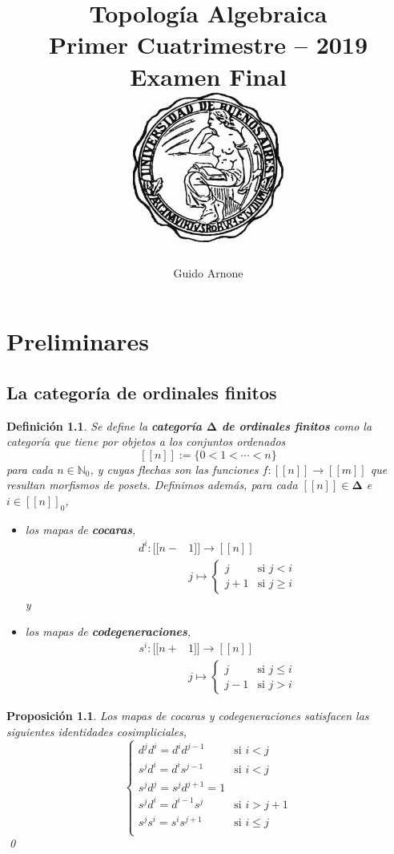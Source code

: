 \documentclass[11pt]{report}
\title{
\LARGE{Topología Algebraica}
\\
\vspace{3pt}
\small{Primer Cuatrimestre -- 2019}
\\
\vspace{0.5pt}
\large{Examen Final}
\\
\vspace{80pt}
{\includegraphics[height=5cm]{uba2.jpg}}
\vspace{80pt}
}
\author{Guido Arnone}
\date{}
\theoremstyle{colored}
\newtheorem{definition}{Definición}[section]
\newtheorem{proposition}{Proposición}[section]
\newcommand{\N}{\mathbb{N}}
\newcommand{\nat}[1]{[\![#1]\!]}
\newcommand{\ord}[1]{\nat{#1}}
\newcommand{\natzero}[1]{\nat{#1}_0}
\newcommand{\ordcat}{\boldsymbol{\Delta}}
\begin{document}
\maketitle
\tableofcontents

\chapter{Preliminares}

\section{La categoría de ordinales finitos}

\begin{definition} Se define la \textbf{categoría $\ordcat$ de ordinales finitos} como la categoría que tiene por objetos a los conjuntos ordenados
\[
\ord{n} := \{0 < 1 < \cdots < n\}
\]
para cada $n \in \N_0$, y cuyas flechas son las funciones $f : \ord{n} \to \ord{m}$ que resultan morfismos de posets. Definimos además, para cada $\ord{n} \in \ordcat$ e $i \in \natzero{n}$, 
\begin{itemize}
\item los mapas de \textbf{cocaras},
\begin{align*}
d^i : \ord{n-&1} \to \ord{n}\\
&j \mapsto \begin{cases}
j &\text{si $j < i$}\\
j+1 &\text{si $j \geq i$}
\end{cases}
\end{align*}
y
\item los mapas de \textbf{codegeneraciones},
\begin{align*}
s^i : \ord{n+&1} \to \ord{n}\\
&j \mapsto \begin{cases}
j &\text{si $j \leq i$}\\
j-1 &\text{si $j > i$}
\end{cases}
\end{align*}
\end{itemize} 
\end{definition}

\begin{proposition} Los mapas de cocaras y codegeneraciones satisfacen las siguientes \textit{identidades cosimpliciales},
\[
\begin{cases}
d^jd^i = d^id^{j-1} &\text{si $i < j$}\\
s^jd^i = d^is^{j-1} &\text{si $i < j$}\\
s^jd^j = s^jd^{j+1} = 1\\
s^jd^i = d^{i-1}s^j &\text{si $i > j+1$}\\
s^js^i = s^is^{j+1} &\text{si $i \leq j$}\\
\end{cases}
\]
\qed \\
\end{proposition}
\end{document}
